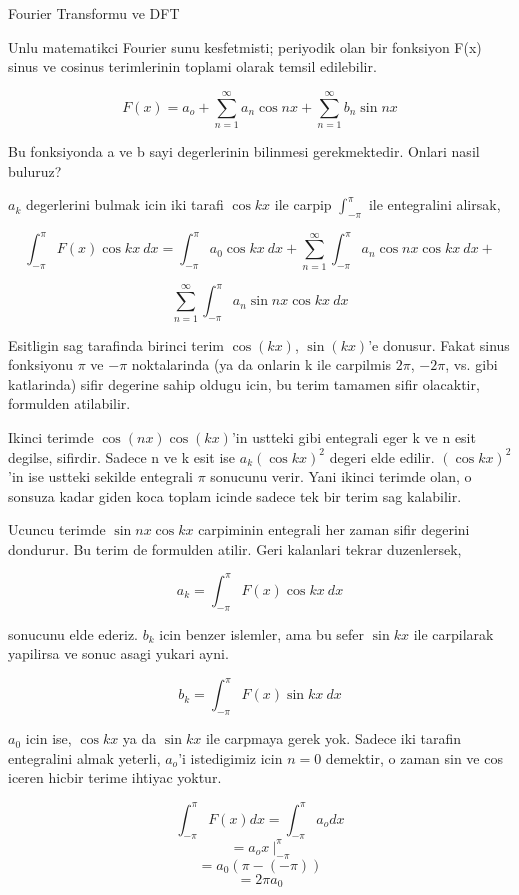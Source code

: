 \documentclass[12pt,fleqn]{article}\usepackage{../common}
\begin{document}
Fourier Transformu ve DFT

Unlu matematikci Fourier sunu kesfetmisti; periyodik olan bir fonksiyon F(x)
sinus ve cosinus terimlerinin toplami olarak temsil edilebilir.

$$ F(x) = a_o + \sum_{n=1}^{\infty}a_n \cos nx + \sum_{n=1}^{\infty}b_n \sin nx  $$

Bu fonksiyonda a ve b sayi degerlerinin bilinmesi gerekmektedir. Onlari nasil
buluruz? 

$a_k$ degerlerini bulmak icin iki tarafi $\cos kx$ ile carpip
$\int_{-\pi}^{\pi}$ ile entegralini alirsak,

$$ \int_{-\pi}^{\pi} F(x)\cos kx \ dx = \int_{-\pi}^{\pi} a_0 \cos
kx \ dx +  \sum_{n=1}^{\infty}\int_{-\pi}^{\pi} a_n \cos nx \cos kx \ dx +   $$

$$ \sum_{n=1}^{\infty}\int_{-\pi}^{\pi} a_n \sin nx \cos kx \ dx   $$

Esitligin sag tarafinda birinci terim $\cos(kx)$, $\sin(kx)$'e donusur. Fakat sinus
fonksiyonu $\pi$ ve $-\pi$ noktalarinda (ya da onlarin k ile carpilmis $2\pi$,
$-2\pi$, vs. gibi katlarinda) sifir degerine sahip oldugu icin, bu terim tamamen
sifir olacaktir, formulden atilabilir.

Ikinci terimde $\cos(nx)\cos(kx)$'in ustteki gibi entegrali eger k ve n esit
degilse, sifirdir. Sadece n ve k esit ise $a_k(\cos kx)^2$ degeri elde edilir.
$(\cos kx)^2$'in ise ustteki sekilde entegrali $\pi$ sonucunu verir. Yani ikinci
terimde olan, o sonsuza kadar giden koca toplam icinde sadece tek bir terim sag
kalabilir.

Ucuncu terimde $\sin nx \cos kx$ carpiminin entegrali her zaman
sifir degerini dondurur. Bu terim de formulden atilir. Geri kalanlari tekrar
duzenlersek, 

$$ a_k = \int_{-\pi}^{\pi} F(x)\cos kx \ dx $$

sonucunu elde ederiz. $b_k$ icin benzer islemler, ama bu sefer $\sin kx$ ile carpilarak yapilirsa ve
sonuc asagi yukari ayni.

$$ b_k = \int_{-\pi}^{\pi} F(x)\sin kx \ dx $$

$a_0$ icin ise, $\cos kx$ ya da $\sin kx$ ile carpmaya gerek yok. Sadece iki
tarafin entegralini almak yeterli, $a_o$'i istedigimiz icin $n=0$ demektir, o
zaman sin ve cos iceren hicbir terime ihtiyac yoktur.

$$  \int_{-\pi}^{\pi} F(x) dx =  \int_{-\pi}^{\pi} a_o dx $$
$$  =  a_o x \ \bigg|_{-\pi}^{\pi}  $$
$$  = a_0 (\pi -(-\pi))  $$
$$  = 2\pi a_0  $$
\end{document}
